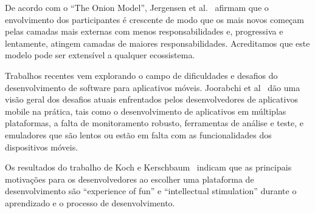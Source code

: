 \documentclass[conference]{IEEEtran}
\begin{document}
De acordo com o “The Onion Model”, Jergensen et al.~\cite{Jergensen2011} afirmam que o envolvimento dos participantes é crescente de modo que os mais novos começam pelas camadas mais externas com menos responsabilidades e, progressiva e lentamente, atingem camadas de maiores responsabilidades. Acreditamos que este modelo pode ser extensível a qualquer ecossistema.

Trabalhos recentes vem explorando o campo de dificuldades e desafios do desenvolvimento de software para aplicativos móveis. Joorabchi et al~\cite{Joorabchi2013} dão uma visão geral dos desafios atuais enfrentados pelos desenvolvedores de aplicativos mobile na prática, tais como o desenvolvimento de aplicativos em múltiplas plataformas, a falta de monitoramento robusto, ferramentas de análise e teste, e emuladores que são lentos ou estão em falta com as funcionalidades dos dispositivos móveis.

Os resultados do trabalho de Koch e Kerschbaum~\cite{Koch2014} indicam que as principais motivações para os desenvolvedores ao escolher uma plataforma de desenvolvimento são “experience of fun” e “intellectual stimulation” durante o aprendizado e o processo de desenvolvimento. 



%
%
%



\end{document}
